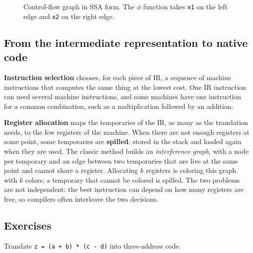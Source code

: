 \begin{figure}[h]
\centering
{}
\caption{Control-flow graph in SSA form. The $\phi$ function takes \texttt{x1} on the left edge and \texttt{x2} on the right edge.}
\label{fig:ssa}
\end{figure}

\subsection{From the intermediate representation to native code}

\textbf{Instruction selection} chooses, for each piece of IR, a sequence of
machine instructions that computes the same thing at the lowest cost. One IR
instruction can need several machine instructions, and some machines have one
instruction for a common combination, such as a multiplication followed by an
addition.

\textbf{Register allocation} maps the temporaries of the IR, as many as the
translation needs, to the few registers of the machine. When there are not
enough registers at some point, some temporaries are \textbf{spilled}: stored
in the stack and loaded again when they are used. The classic method builds an
\emph{interference graph}, with a node per temporary and an edge between two
temporaries that are live at the same point and cannot share a register.
Allocating $k$ registers is coloring this graph with $k$ colors; a temporary
that cannot be colored is spilled. The two problems are not independent: the
best instruction can depend on how many registers are free, so compilers often
interleave the two decisions.

\subsection{Exercises}

\begin{exercise}
Translate \texttt{z = (a + b) * (c - d)} into three-address code.
\end{exercise}

